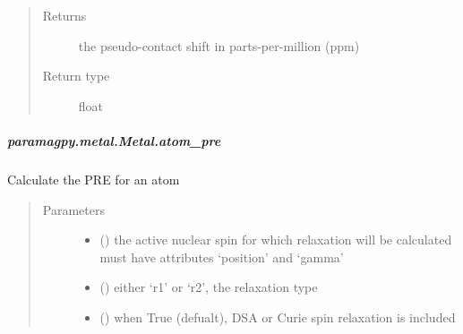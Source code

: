 \documentclass[a4paper,10pt,english,openany,oneside]{sphinxmanual}
\begin{document}
\begin{fulllineitems}
\begin{fulllineitems}
\begin{fulllineitems}
\begin{quote}
\begin{description}
\item[{Returns}] \leavevmode
{} \textendash{} the pseudo-contact shift in parts-per-million (ppm)

\item[{Return type}] \leavevmode
float

\end{description}\end{quote}

\end{fulllineitems}



\subparagraph{paramagpy.metal.Metal.atom\_pre}
\label{\detokenize{reference/generated/paramagpy.metal.Metal.atom_pre:paramagpy-metal-metal-atom-pre}}\label{\detokenize{reference/generated/paramagpy.metal.Metal.atom_pre::doc}}

\begin{fulllineitems}
\label{\detokenize{reference/generated/paramagpy.metal.Metal.atom_pre:paramagpy.metal.Metal.atom_pre}}
Calculate the PRE for an atom
\begin{quote}\begin{description}
\item[{Parameters}] \leavevmode\begin{itemize}
\item {} 
 ({\hyperref[\detokenize{reference/generated/paramagpy.protein.CustomAtom:paramagpy.protein.CustomAtom}]{}}) \textendash{} the active nuclear spin for which relaxation will be calculated
must have attributes ‘position’ and ‘gamma’

\item {} 
 () \textendash{} either ‘r1’ or ‘r2’, the relaxation type

\item {} 
 (\sphinxstyleliteralemphasis{\sphinxupquote{ (}}\sphinxstyleliteralemphasis{\sphinxupquote{)}}) \textendash{} when True (defualt), DSA or Curie spin relaxation is included


\end{itemize}
\end{description}
\end{quote}
\end{fulllineitems}
\end{fulllineitems}
\end{fulllineitems}
\end{document}
